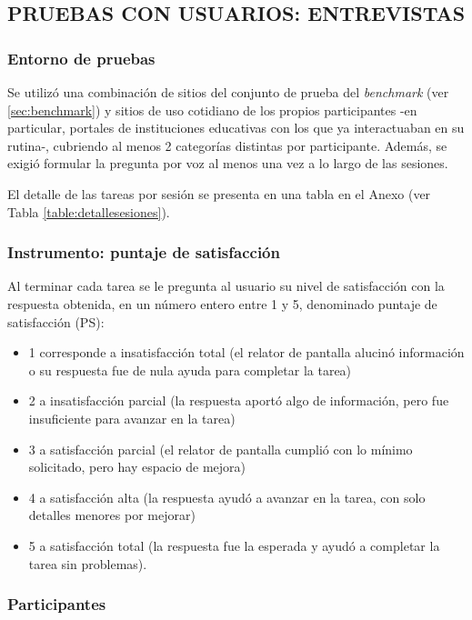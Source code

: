 \subsection{PRUEBAS CON USUARIOS: ENTREVISTAS}

\subsubsection{Entorno de pruebas}

 Se utilizó una combinación de sitios del conjunto de prueba del \textit{benchmark} (ver \ref{sec:benchmark}) y sitios de uso cotidiano de los propios participantes -en particular, portales de instituciones educativas con los que ya interactuaban en su rutina-, cubriendo al menos 2 categorías distintas por participante. Además, se exigió formular la pregunta por voz al menos una vez a lo largo de las sesiones.

El detalle de las tareas por sesión se presenta en una tabla en el Anexo (ver Tabla \ref{table:detallesesiones}).

\subsubsection{Instrumento: puntaje de satisfacción}

Al terminar cada tarea se le pregunta al usuario su nivel de satisfacción con la respuesta obtenida, en un número entero entre 1 y 5, denominado puntaje de satisfacción (PS):
\begin{itemize}
    \item 1 corresponde a insatisfacción total (el relator de pantalla alucinó información o su respuesta fue de nula ayuda para completar la tarea)
    \item 2 a insatisfacción parcial (la respuesta aportó algo de información, pero fue insuficiente para avanzar en la tarea)
    \item 3 a satisfacción parcial (el relator de pantalla cumplió con lo mínimo solicitado, pero hay espacio de mejora)
    \item 4 a satisfacción alta (la respuesta ayudó a avanzar en la tarea, con solo detalles menores por mejorar)
    \item 5 a satisfacción total (la respuesta fue la esperada y ayudó a completar la tarea sin problemas).
\end{itemize}
\subsubsection{Participantes}


